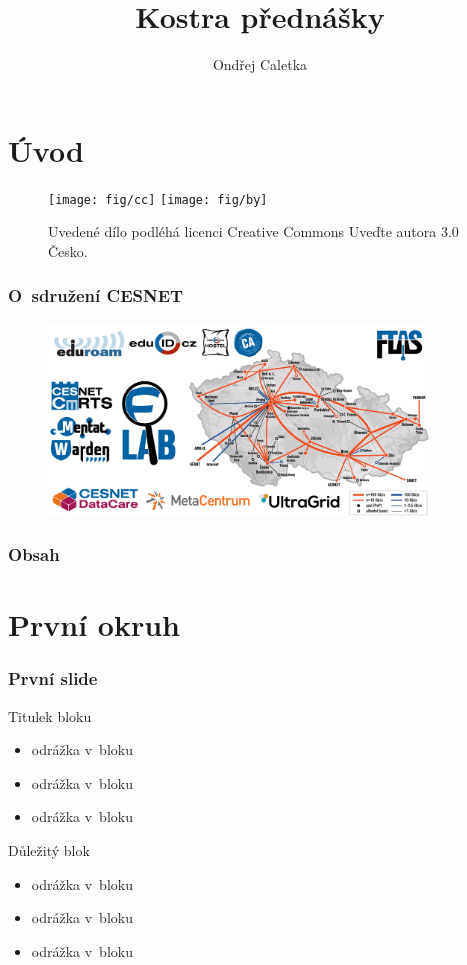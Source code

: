 \documentclass[hyperref={pdfpagelabels=false},xcolor=dvipsnames,12pt,aspectratio=169]{beamer}
\title{Kostra přednášky}
\author{Ondřej Caletka}
\institute[CESNET, z. s. p. o.]{\texttt{[image: fig/cesnet-20let-rozsirena]}}
\begin{document}
\section*{Úvod}

{
\begin{frame}
 \titlepage
 \begin{figure}
		\texttt{[image: fig/cc]}
		\hspace*{0.5ex}
		\texttt{[image: fig/by]}

		\tiny Uvedené dílo podléhá licenci Creative Commons Uveďte autora 3.0 Česko.
 \end{figure}
\end{frame}
\begin{frame}
 \frametitle{O~sdružení CESNET}
 \begin{figure}
     \includegraphics[width=0.9\textwidth]{fig/osdruzeni169}
 \end{figure}
\end{frame}
}

\begin{frame}
 \frametitle{Obsah}
 \tableofcontents
\end{frame}

\section{První okruh}

\begin{frame}
	\frametitle{První slide}
	\begin{block}{Titulek bloku}
		\begin{itemize}
			\item odrážka v~bloku
			\item odrážka v~bloku
			\item odrážka v~bloku
		\end{itemize}
	\end{block}
	\begin{alertblock}{Důležitý blok}
		\begin{itemize}
			\item odrážka v~bloku
			\item odrážka v~bloku
			\item odrážka v~bloku
		\end{itemize}
	\end{alertblock}
\end{frame}
\end{document}
